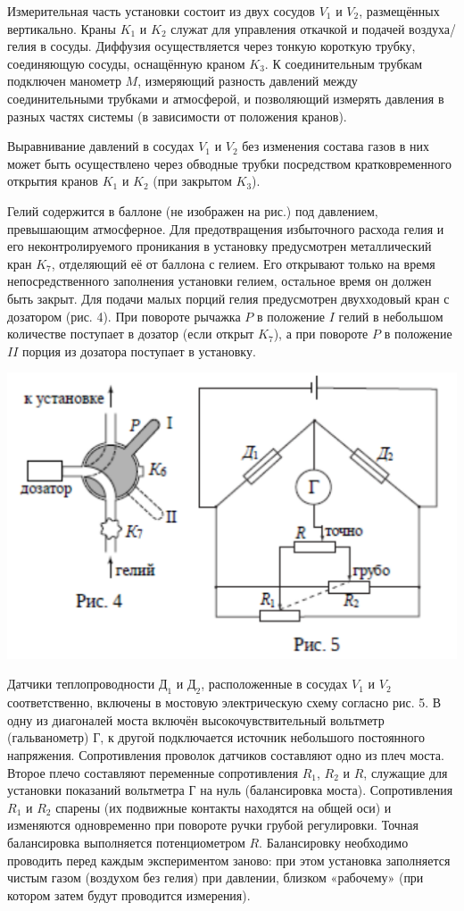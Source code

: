 \documentclass[a4paper,12pt]{article}
\begin{document}
Измерительная часть установки состоит из двух сосудов $V_1$ и $V_2$, размещённых вертикально. Краны $K_1$ и $K_2$ служат для управления откачкой и подачей воздуха/гелия в сосуды. Диффузия осуществляется через тонкую короткую трубку, соединяющую сосуды, оснащённую краном $K_3$. К соединительным трубкам подключен манометр $M$, измеряющий разность давлений между соединительными трубками и атмосферой, и позволяющий измерять давления в разных частях системы (в зависимости от положения кранов).

Выравнивание давлений в сосудах $V_1$ и $V_2$ без изменения состава газов в них может быть осуществлено через обводные трубки посредством кратковременного открытия кранов $K_1$ и $K_2$ (при закрытом $K_3$).

Гелий содержится в баллоне (не изображен на рис.) под давлением, превышающим атмосферное. Для предотвращения избыточного расхода гелия и его неконтролируемого проникания в установку предусмотрен металлический кран $K_7$, отделяющий её от баллона с гелием. Его открывают только на время непосредственного заполнения установки гелием, остальное время он должен быть закрыт. Для подачи малых порций гелия предусмотрен двухходовый кран с дозатором (рис. 4). При повороте рычажка $P$ в положение $I$ гелий в небольшом количестве поступает в дозатор (если открыт $K_7$), а при повороте $P$ в положение $II$ порция из дозатора поступает в установку.
\begin{center}
    \includegraphics[scale = 1.0]{2213.png}
\end{center}
Датчики теплопроводности $\text{Д}_1$ и $\text{Д}_2$, расположенные в сосудах $V_1$ и $V_2$ соответственно, включены в мостовую электрическую схему согласно рис. 5. В одну из диагоналей моста включён высокочувствительный вольтметр (гальванометр) Г, к другой подключается источник небольшого постоянного напряжения. Сопротивления проволок датчиков составляют одно из плеч моста. Второе плечо составляют переменные сопротивления $R_1$, $R_2$ и $R$, служащие для установки показаний вольтметра Г на нуль (балансировка моста). Сопротивления $R_1$ и $R_2$ спарены (их подвижные контакты находятся на общей оси) и изменяются одновременно при повороте ручки грубой регулировки. Точная балансировка выполняется потенциометром $R$. Балансировку необходимо проводить перед каждым экспериментом заново: при этом установка заполняется чистым газом (воздухом без гелия) при давлении, близком «рабочему» (при котором затем будут проводится измерения).
\end{document}
